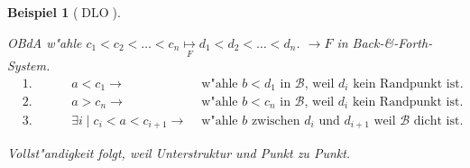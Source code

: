 \documentclass[a4paper,12pt,numbers=noenddot,parskip=full]{scrartcl}
\newcommand{\scrB}{\mathcal{B}}
\DeclareMathOperator{\dlo}{DLO}
\theoremstyle{dotless}
\newtheorem{example}[theorem]{Beispiel}
\theoremstyle{remark}
\begin{document}
\begin{example}[$\dlo$]
\begin{enumerate}
		OBdA w"ahle $c_1<c_2<\dots<c_n \underset{F}{\mapsto} d_1<d_2<\dots<d_n$. $\longrightarrow F$ in Back-\&-Forth-System.
		\begin{align*}
			&\text{1. Fall: } &a< c_1 \rightarrow &\text{ w"ahle } b<d_1 \text{ in } \scrB \text{, weil } d_i \text{ kein Randpunkt ist.}\\
			&\text{2. Fall: } &a>c_n \rightarrow &\text{ w"ahle } b<c_n \text{ in } \scrB \text{, weil } d_i \text{ kein Randpunkt ist.}\\
			&\text{3. Fall: } &\exists i \mid c_i<a<c_{i+1} \rightarrow &\text{ w"ahle } b \text{ zwischen } d_i \text{ und } d_{i+1} \text{ weil } \scrB \text{ dicht ist.}
		\end{align*}
		
		Vollst"andigkeit folgt, weil Unterstruktur und Punkt zu Punkt.
	\end{enumerate}
\end{example}
\end{document}
